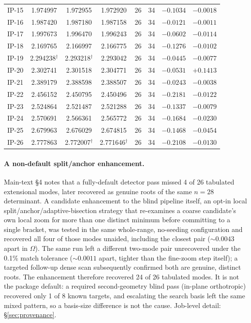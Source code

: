 \documentclass[11pt]{article}
\begin{document}
\begin{table}[!t]
\begin{tabular}{cccccccc}
IP-15 & 1.974997 & 1.972955 & 1.972920 & 26 & 34 & $-0.1034$ & $-0.0018$\\
IP-16 & 1.987420 & 1.987180 & 1.987158 & 26 & 34 & $-0.0121$ & $-0.0011$\\
IP-17 & 1.997673 & 1.996470 & 1.996243 & 26 & 34 & $-0.0602$ & $-0.0114$\\
IP-18 & 2.169765 & 2.166997 & 2.166775 & 26 & 34 & $-0.1276$ & $-0.0102$\\
IP-19 & 2.294238$^\dagger$ & 2.293218$^\dagger$ & 2.293042 & 26 & 34 & $-0.0445$ & $-0.0077$\\
IP-20 & 2.302741 & 2.301518 & 2.304771 & 26 & 34 & $-0.0531$ & $+0.1413$\\
IP-21 & 2.389179 & 2.388598 & 2.388507 & 26 & 34 & $-0.0243$ & $-0.0038$\\
IP-22 & 2.456152 & 2.450795 & 2.450496 & 26 & 34 & $-0.2181$ & $-0.0122$\\
IP-23 & 2.524864 & 2.521487 & 2.521288 & 26 & 34 & $-0.1337$ & $-0.0079$\\
IP-24 & 2.570691 & 2.566361 & 2.565772 & 26 & 34 & $-0.1684$ & $-0.0230$\\
IP-25 & 2.679963 & 2.676029 & 2.674815 & 26 & 34 & $-0.1468$ & $-0.0454$\\
IP-26 & 2.777863 & 2.772007$^\dagger$ & 2.771646$^\dagger$ & 26 & 34 & $-0.2108$ & $-0.0130$\\ \bottomrule
\end{tabular}
\renewcommand{\arraystretch}{1}
\end{table}

\paragraph{A non-default split/anchor enhancement.}
Main-text \S4 notes that a fully-default detector pass missed 4 of 26
tabulated extensional modes, later recovered as genuine roots of the
same $n=28$ determinant. A candidate enhancement to the blind pipeline
itself, an opt-in local split/anchor/adaptive-bisection strategy that
re-examines a coarse candidate's own local zoom for more than one
distinct minimum before committing to a single bracket, was tested in
the same whole-range, no-seeding configuration and recovered all four of
those modes unaided, including the closest pair (${\sim}0.0043$ apart in
$\Omega$). The same run left a different two-mode pair unrecovered under
the 0.1\% match tolerance (${\sim}0.0011$ apart, tighter than the
fine-zoom step itself); a targeted follow-up dense scan subsequently
confirmed both are genuine, distinct roots. The enhancement therefore
recovered 24 of 26 tabulated modes. It is not the package default: a
required second-geometry blind pass (in-plane orthotropic) recovered
only 1 of 8 known targets, and escalating the search basis left the
same mixed pattern, so a basis-size difference is not the cause.
Job-level detail: \S\ref{sec:provenance}.
\end{document}
